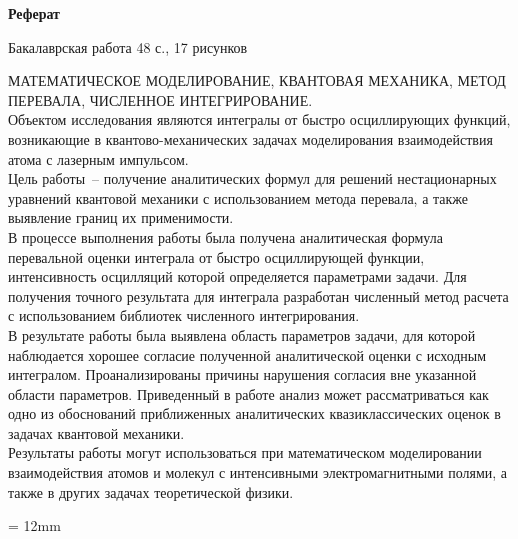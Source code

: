 \documentclass[14pt, a4paper]{article}
\numberwithin{figure}{section}
\numberwithin{equation}{section}
\begin{document}
\newpage%
\addtocounter{page}{1}
\begin{center}
{\normalsize \textbf{Реферат}}
\end{center}

\begin{flushleft}
Бакалаврская работа 48 с., 17 рисунков         \\
\vspace{0.5cm}

МАТЕМАТИЧЕСКОЕ МОДЕЛИРОВАНИЕ, КВАНТОВАЯ МЕХАНИКА, МЕТОД ПЕРЕВАЛА, ЧИСЛЕННОЕ ИНТЕГРИРОВАНИЕ.\\
\vspace{0.5cm}
Объектом исследования являются интегралы от быстро осциллирующих функций, возникающие в квантово-механических задачах моделирования взаимодействия атома с лазерным импульсом. \\
\vspace{0.5cm}
Цель работы~-- получение аналитических формул для решений нестационарных уравнений квантовой механики с использованием метода перевала, а также выявление границ их применимости.\\
\vspace{0.5cm}
В процессе выполнения работы была получена аналитическая формула перевальной оценки интеграла от быстро осциллирующей функции, интенсивность осцилляций которой определяется параметрами задачи. Для получения точного результата для интеграла разработан численный метод расчета с использованием библиотек численного интегрирования. \\
\vspace{0.5cm}
В результате работы была выявлена область параметров задачи, для которой наблюдается хорошее согласие полученной аналитической оценки с исходным интегралом. Проанализированы причины нарушения согласия вне указанной области параметров. Приведенный в работе анализ может рассматриваться как одно из обоснований приближенных аналитических квазиклассических оценок в задачах квантовой механики. \\
\vspace{0.5cm}
Результаты работы могут использоваться при математическом моделировании взаимодействия атомов и молекул с интенсивными электромагнитными полями, а также в других задачах теоретической физики. 
\end{flushleft}

{}
\parindent = 12mm

\end{document}
